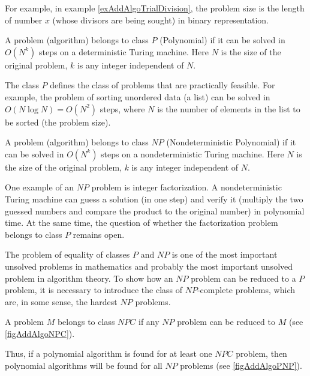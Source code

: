For example, in example \ref{exAddAlgoTrialDivision}, the problem size is
the length of number $x$ (whose divisors are being sought) in binary
representation. 

\begin{definition}[Class $P$]
A problem (algorithm) belongs to class $P$ (Polynomial) if it can be solved in 
 $O\left(N^k\right)$ steps on a deterministic Turing machine.
Here $N$ is the size of the original problem, $k$ is any integer
independent of $N$.  
\end{definition}

The class $P$ defines the class of problems that are practically
feasible. For example, the problem of sorting unordered data
(a list) can be solved in 
$O\left(N \log N \right) = O\left(N^2\right)$ steps, where $N$ is the number
of elements in the list to be sorted (the problem size).

\begin{definition}[Class $NP$]
A problem (algorithm) belongs to class $NP$ (Nondeterministic Polynomial) if
it can be solved in  $O\left(N^k\right)$ steps on
a nondeterministic Turing machine. Here $N$ is the size of the original
problem, $k$ is any integer independent of $N$. 
\end{definition}

One example of an $NP$ problem is integer factorization.
A nondeterministic Turing machine can guess a solution (in
one step) and verify it (multiply the two guessed numbers and compare
the product to the original number) in polynomial time. At the same
time, the question of whether the factorization problem belongs to class $P$
remains open.



The problem of equality of classes $P$ and $NP$ is one of the most important
unsolved problems in mathematics and probably the most important unsolved problem
in algorithm theory. To show how an $NP$ problem can be reduced to a $P$ problem,
it is necessary to introduce the class of $NP$-complete problems,
which are, in some sense, the hardest $NP$ problems.

\begin{definition}
A problem $M$ belongs to class $NPC$ if any $NP$ problem
can be reduced to $M$ (see \autoref{figAddAlgoNPC}).
\end{definition}



Thus, if a polynomial algorithm is found for at least
one $NPC$ problem, then polynomial algorithms will be found
for all $NP$ problems (see \autoref{figAddAlgoPNP}). 
 

